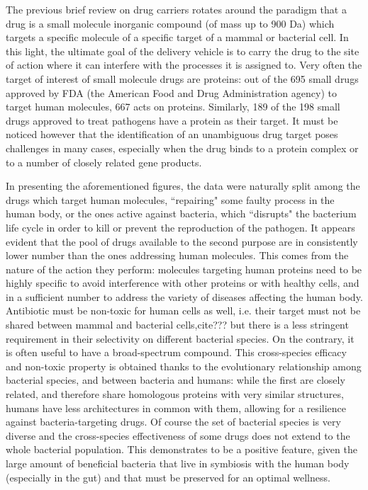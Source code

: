 \documentclass[a4paper,11pt]{extreport}
\begin{document}
The previous brief review on drug carriers rotates around the paradigm that a drug is a small molecule inorganic compound (of mass up to 900 Da) which targets a specific molecule of a specific target of a mammal or bacterial cell. In this light, the ultimate goal of the delivery vehicle is to carry the drug to the site of action where it can interfere with the processes it is assigned to. Very often the target of interest of small molecule drugs are proteins: out of the 695 small drugs approved by FDA (the American Food and Drug Administration agency) to target human molecules, 667 acts on proteins. Similarly, 189 of the 198 small drugs approved to treat pathogens have a protein as their target.\cite{Santos2017}
%
It must be noticed however that the identification of an unambiguous drug target poses challenges in many cases, especially when the drug binds to a protein complex or to a number of closely related gene products.\cite{Santos2017}

In presenting the aforementioned figures, the data were naturally split among the drugs which target human molecules, ``repairing" some faulty process in the human body, or the ones active against bacteria, which ``disrupts" the bacterium life cycle in order to kill or prevent the reproduction of the pathogen.
%
It appears evident that the pool of drugs available to the second purpose are in consistently lower number than the ones addressing human molecules. This comes from the nature of the action they perform: molecules targeting human proteins need to be highly specific to avoid interference with other proteins or with healthy cells, and in a sufficient number to address the variety of diseases affecting the human body.
%
Antibiotic must be non-toxic for human cells as well, i.e. their target must not be shared between mammal and bacterial cells,cite{???} but there is a less stringent requirement in their selectivity on different bacterial species. On the contrary, it is often useful to have a broad-spectrum compound. This cross-species efficacy and non-toxic property is obtained thanks to the evolutionary relationship among bacterial species, and between bacteria and humans: while the first are closely related, and therefore share homologous proteins with very similar structures, humans have less architectures in common with them, allowing for a resilience against bacteria-targeting drugs.\cite{???}
%
Of course the set of bacterial species is very diverse and the cross-species effectiveness of some drugs does not extend to the whole bacterial population. This demonstrates to be a positive feature, given the large amount of beneficial bacteria that live in symbiosis with the human body (especially in the gut\cite{???}) and that must be preserved for an optimal wellness.
\end{document}
